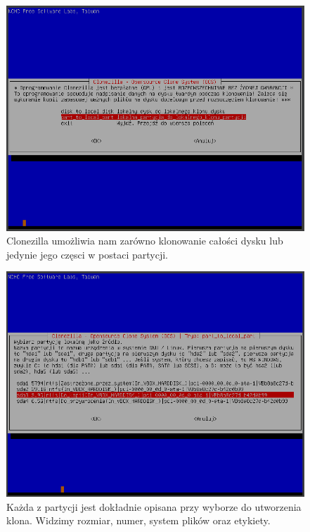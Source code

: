 \documentclass[0.82pt,a4paper]{article}
\begin{document}
    \begin{figure}[H]
        \centering
        \includegraphics[width=0.8\linewidth]{media/Clonezilla/clone5.PNG}
        \caption[clone dyskpart]{Clonezilla umożliwia nam zarówno klonowanie całości dysku lub jedynie jego częsci w postaci partycji.}
        \label{fig:clone5}
    \end{figure}
    
    \begin{figure}[H]
        \centering
        \includegraphics[width=0.8\linewidth]{media/Clonezilla/clone6.PNG}
        \caption[clone lista]{Każda z partycji jest dokładnie opisana przy wyborze do utworzenia klona. Widzimy rozmiar, numer, system plików oraz etykiety.}
        \label{fig:clone6}
    \end{figure}
    
\end{document}

